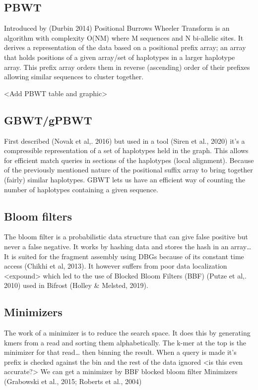 \documentclass[11pt]{article}
\begin{document}
\subsection{PBWT}
\label{sec:orgd9e057a}
Introduced by  (Durbin 2014) Positional Burrows Wheeler Transform is an algorithm with complexity O(NM) where M sequences and N bi-allelic sites.
It derives a representation of the data based on a positional prefix array; an array that holds positions of a given array/set of haplotypes in a larger haplotype array. This prefix array orders them in reverse (ascending) order of their prefixes allowing similar sequences to cluster together.

<Add PBWT table and graphic>

\subsection{GBWT/gPBWT}
\label{sec:orga3967c7}
First described (Novak et al,. 2016) but used in a tool (Siren et al., 2020) it’s a compressible representation of a set of haplotypes held in the graph. This allows for efficient match queries in sections of the haplotypes (local alignment). Because of the previously mentioned nature of the positional suffix array to bring together (fairly) similar haplotypes. GBWT lets us have an efficient way of counting the number of haplotypes containing a given sequence.

\subsection{Bloom filters}
\label{sec:org4215751}
The bloom filter is a probabilistic data structure that can give false positive but never a false negative.  It works by hashing data and stores the hash in an array\ldots{}
It is suited for the fragment assembly using DBGs because of its constant time access (Chikhi et al, 2013). It however suffers from poor data localization <expound> which led to the use of Blocked Bloom Filters (BBF) (Putze et al,. 2010) used in Bifrost (Holley \& Melsted, 2019).

\subsection{Minimizers}
\label{sec:orgd9868a7}
The work of a minimizer is to reduce the search space. It does this by generating kmers from a read and sorting them alphabetically. The k-mer at the top is the minimizer for that read\ldots{} then binning the result. When a query is made it’s prefix is checked against the bin and the rest of the data ignored <is this even accurate?>
We can get a minimizer by BBF blocked bloom filter Minimizers (Grabowski et al., 2015; Roberts et al., 2004)
\end{document}
